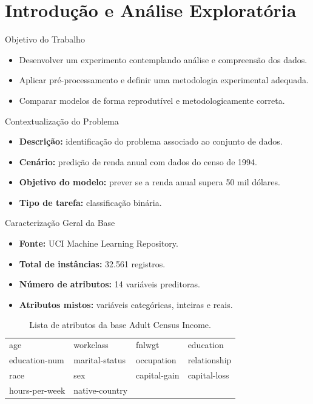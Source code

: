 
\section{Introdução e Análise Exploratória}

\begin{slide}{Objetivo do Trabalho}
  \begin{itemize}
    \item Desenvolver um experimento contemplando análise e compreensão dos dados.
    \item Aplicar pré-processamento e definir uma metodologia experimental adequada.
    \item Comparar modelos de forma reprodutível e metodologicamente correta.
  \end{itemize}
\end{slide}

\begin{slide}{Contextualização do Problema}
  \begin{itemize}
    \item \textbf{Descrição:} identificação do problema associado ao conjunto de dados.
    \item \textbf{Cenário:} predição de renda anual com dados do censo de 1994.
    \item \textbf{Objetivo do modelo:} prever se a renda anual supera 50 mil dólares.
    \item \textbf{Tipo de tarefa:} classificação binária.
  \end{itemize}
\end{slide}

\begin{slide}{Caracterização Geral da Base}
  \begin{itemize}
    \item \textbf{Fonte:} UCI Machine Learning Repository.
    \item \textbf{Total de instâncias:} 32.561 registros.
    \item \textbf{Número de atributos:} 14 variáveis preditoras.
    \item \textbf{Atributos mistos:} variáveis categóricas, inteiras e reais.
  \end{itemize}

  \vspace{0.3cm}
  \scriptsize
  \begin{table}
    \centering
    \begin{tabular}{llll}
      \toprule
      age & workclass & fnlwgt & education \\
      education-num & marital-status & occupation & relationship \\
      race & sex & capital-gain & capital-loss \\
      hours-per-week & native-country &  &  \\
      \bottomrule
    \end{tabular}
    \caption{Lista de atributos da base Adult Census Income.}
  \end{table}
\end{slide}

